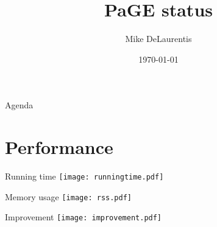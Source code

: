 \documentclass{beamer}
\title[PaGE status]{PaGE status}
\author{Mike DeLaurentis}
\institute{University of Pennsylvania}
\date{\today}
\begin{document}
\begin{frame}
\titlepage
\end{frame}

\begin{frame}{Agenda}
  \tableofcontents
\end{frame}

\section{Performance}

\begin{frame}{Running time}
  \texttt{[image: runningtime.pdf]}
\end{frame}

\begin{frame}{Memory usage}
  \texttt{[image: rss.pdf]}
\end{frame}

\begin{frame}{Improvement}
  \texttt{[image: improvement.pdf]}
\end{frame}
\end{document}
